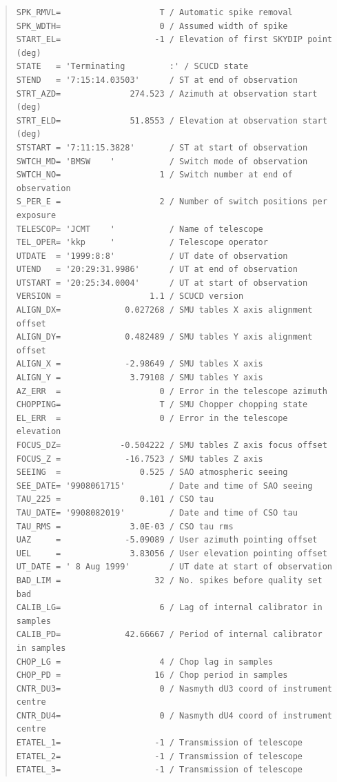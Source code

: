 \documentclass[twoside,11pt]{article}
\newenvironment{myquote}{\begin{quote}\begin{small}}{\end{small}\end{quote}}
\renewcommand{\_}{\texttt{\symbol{95}}}
\begin{document}
\begin{myquote}
\begin{verbatim}
SPK_RMVL=                    T / Automatic spike removal
SPK_WDTH=                    0 / Assumed width of spike
START_EL=                   -1 / Elevation of first SKYDIP point (deg)
STATE   = 'Terminating         :' / SCUCD state
STEND   = '7:15:14.03503'      / ST at end of observation
STRT_AZD=              274.523 / Azimuth at observation start (deg)
STRT_ELD=              51.8553 / Elevation at observation start (deg)
STSTART = '7:11:15.3828'       / ST at start of observation
SWTCH_MD= 'BMSW    '           / Switch mode of observation
SWTCH_NO=                    1 / Switch number at end of observation
S_PER_E =                    2 / Number of switch positions per exposure
TELESCOP= 'JCMT    '           / Name of telescope
TEL_OPER= 'kkp     '           / Telescope operator
UTDATE  = '1999:8:8'           / UT date of observation
UTEND   = '20:29:31.9986'      / UT at end of observation
UTSTART = '20:25:34.0004'      / UT at start of observation
VERSION =                  1.1 / SCUCD version
ALIGN_DX=             0.027268 / SMU tables X axis alignment offset
ALIGN_DY=             0.482489 / SMU tables Y axis alignment offset
ALIGN_X =             -2.98649 / SMU tables X axis
ALIGN_Y =              3.79108 / SMU tables Y axis
AZ_ERR  =                    0 / Error in the telescope azimuth
CHOPPING=                    T / SMU Chopper chopping state
EL_ERR  =                    0 / Error in the telescope elevation
FOCUS_DZ=            -0.504222 / SMU tables Z axis focus offset
FOCUS_Z =             -16.7523 / SMU tables Z axis
SEEING  =                0.525 / SAO atmospheric seeing
SEE_DATE= '9908061715'         / Date and time of SAO seeing
TAU_225 =                0.101 / CSO tau
TAU_DATE= '9908082019'         / Date and time of CSO tau
TAU_RMS =              3.0E-03 / CSO tau rms
UAZ     =             -5.09089 / User azimuth pointing offset
UEL     =              3.83056 / User elevation pointing offset
UT_DATE = ' 8 Aug 1999'        / UT date at start of observation
BAD_LIM =                   32 / No. spikes before quality set bad
CALIB_LG=                    6 / Lag of internal calibrator in samples
CALIB_PD=             42.66667 / Period of internal calibrator in samples
CHOP_LG =                    4 / Chop lag in samples
CHOP_PD =                   16 / Chop period in samples
CNTR_DU3=                    0 / Nasmyth dU3 coord of instrument centre
CNTR_DU4=                    0 / Nasmyth dU4 coord of instrument centre
ETATEL_1=                   -1 / Transmission of telescope
ETATEL_2=                   -1 / Transmission of telescope
ETATEL_3=                   -1 / Transmission of telescope

\end{verbatim}
\end{myquote}
\end{document}
